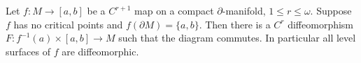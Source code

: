 Let $f: M \to [a, b]$ be a $C^{r+1}$ map on a compact $\partial$-manifold, $1 \leqslant r \leqslant \omega$. Suppose $f$ has no critical points and $f(\partial M) = \{a, b\}$. Then there is a $C^r$ diffeomorphism $F: f^{-1}(a) \times [a, b] \to M$ such that the diagram commutes. In particular all level surfaces of $f$ are diffeomorphic.
